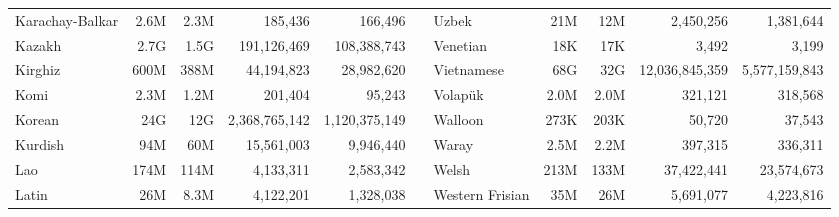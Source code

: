 \begin{table*}[t!]
{\begin{tabular}{@{}lrrrrclrrrr@{}}
            Karachay-Balkar           & 2.6M                     & 2.3M                      & 185,436                  & 166,496                   &                          & Uzbek                     & 21M                      & 12M                       & 2,450,256                & 1,381,644                 \\
            Kazakh                    & 2.7G                     & 1.5G                      & 191,126,469              & 108,388,743               &                          & Venetian                  & 18K                      & 17K                       & 3,492                    & 3,199                     \\
            Kirghiz                   & 600M                     & 388M                      & 44,194,823               & 28,982,620                &                          & Vietnamese                & 68G                      & 32G                       & 12,036,845,359           & 5,577,159,843             \\
            Komi                      & 2.3M                     & 1.2M                      & 201,404                  & 95,243                    &                          & Volapük                   & 2.0M                     & 2.0M                      & 321,121                  & 318,568                   \\
            Korean                    & 24G                      & 12G                       & 2,368,765,142            & 1,120,375,149             &                          & Walloon                   & 273K                     & 203K                      & 50,720                   & 37,543                    \\
            Kurdish                   & 94M                      & 60M                       & 15,561,003               & 9,946,440                 &                          & Waray                     & 2.5M                     & 2.2M                      & 397,315                  & 336,311                   \\
            Lao                       & 174M                     & 114M                      & 4,133,311                & 2,583,342                 &                          & Welsh                     & 213M                     & 133M                      & 37,422,441               & 23,574,673                \\
            Latin                     & 26M                      & 8.3M                      & 4,122,201                & 1,328,038                 &                          & Western Frisian           & 35M                      & 26M                       & 5,691,077                & 4,223,816                 \\

\end{tabular}}
\end{table*}
